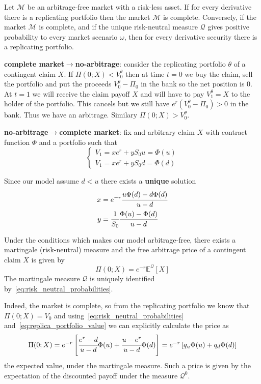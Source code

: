 \documentclass[12pt,a4paper]{article}
\begin{document}
Let $\mathcal{M}$ be an arbitrage-free market with a risk-less asset. If for every derivative there is a replicating portfolio
then the market $\mathcal{M}$ is complete. Conversely, if the market $\mathcal{M}$ is complete, and if the unique risk-neutral measure $\mathcal{Q}$ gives positive probability to every market scenario $\omega$, then for every derivative security there is a replicating portfolio.%

\textbf{complete market$\rightarrow$no-arbitrage}: consider the replicating portfolio $\theta$ of a contingent claim $X$. If $\Pi(0; X) < V_0^\theta$ then at time $t=0$ we buy the claim, sell the portfolio and put the proceeds $V_0^\theta-\Pi_0$ in the bank so the net position is 0. At $t=1$ we will receive the claim payoff $X$ and will have to pay $V_1^\theta =X$  to the holder of the portfolio. This cancels but we still have $e^r(V_0^\theta-\Pi_0)>0$ in the bank. Thus we have an arbitrage. Similary $\Pi(0; X) > V_0^\theta$.
	
\textbf{no-arbitrage$\rightarrow$complete market}: fix and arbitrary claim $X$ with contract function $\Phi$ and a portfolio such that
\begin{equation*}
\begin{cases}
V_1 = x e^r + yS_0u = \Phi(u)\\
V_1 = x e^r + yS_0d = \Phi(d)
\end{cases}
\end{equation*}
			
Since our model assume $d<u$ there exists a \textbf{unique} solution
\begin{equation}
\begin{aligned}
x &= e^{-r}\cfrac{u\Phi(d)-d\Phi(d)}{u-d} \\
y &= \cfrac{1}{S_0}\cfrac{\Phi(u)-\Phi(d)}{u-d}
\end{aligned}
\label{eq:replica_portfolio_value}
\end{equation}

Under the conditions which makes our model arbitrage-free, there exists a martingale (risk-neutral) measure and the free arbitrage price of a contingent claim $X$ is given by 
\begin{equation*}
\Pi(0; X) = e^{-r}\mathbb{E}^{\mathcal{Q}}[X]
\end{equation*} 
The martingale measure $\mathcal{Q}$ is uniquely identified by~\ref{eq:risk_neutral_probabilities}.
		
Indeed, the market is complete, so from the replicating portfolio we know that $\Pi(0;X) = V_0$ and using~\ref{eq:risk_neutral_probabilities} and~\ref{eq:replica_portfolio_value} we can explicitly calculate the price as
\begin{equation*}
\Pi(0;X) = e^{-r}\left[\cfrac{e^r-d}{u-d}\Phi(u)+\cfrac{u-e^r}{u-d}\Phi(d)\right] = e^{-r}\left[q_u\Phi(u)+q_d\Phi(d)\right]
\end{equation*}
the expected value, under the martingale measure.
Such a price is given by the expectation of the discounted payoff under the measure $\mathcal{Q}^0$.
		
\end{document}
